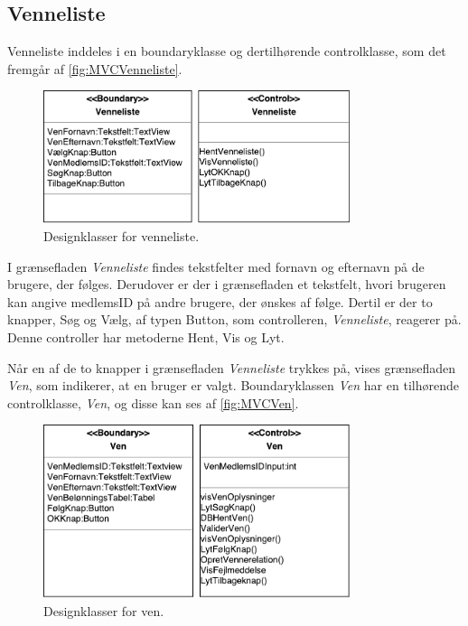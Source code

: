 \subsection*{Venneliste}
Venneliste inddeles i en boundaryklasse og dertilhørende controlklasse, som det fremgår af \autoref{fig:MVCVenneliste}. 

\begin{figure} [H]
\centering
\includegraphics[width=0.8\textwidth]{figures/MVC/MVCVenneliste}
\caption{Designklasser for venneliste.}
\label{fig:MVCVenneliste}
\end{figure}

\noindent
I grænsefladen \textit{Venneliste} findes tekstfelter med fornavn og efternavn på de brugere, der følges. Derudover er der i grænsefladen et tekstfelt, hvori brugeren kan angive medlemsID på andre brugere, der ønskes af følge. Dertil er der to knapper, Søg og Vælg, af typen Button, som controlleren, \textit{Venneliste}, reagerer på. Denne controller har metoderne Hent, Vis og Lyt.

Når en af de to knapper i grænsefladen \textit{Venneliste} trykkes på, vises grænsefladen \textit{Ven}, som indikerer, at en bruger er valgt. Boundaryklassen \textit{Ven} har en tilhørende controlklasse, \textit{Ven}, og disse kan ses af \autoref{fig:MVCVen}.

\begin{figure} [H]
\centering
\includegraphics[width=0.8\textwidth]{figures/MVC/MVCVen}
\caption{Designklasser for ven.}
\label{fig:MVCVen}
\end{figure}

